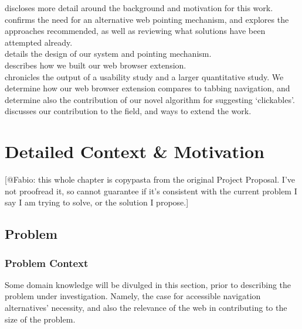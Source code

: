 \documentclass[a4paper, 12pt]{report}
\begin{document}
 discloses more detail around the background and motivation for this work.\\
 confirms the need for an alternative web pointing mechanism, and explores the approaches recommended, as well as reviewing what solutions have been attempted already.\\ %
 details the design of our system and pointing mechanism.\\
 describes how we built our web browser extension.\\
 chronicles the output of a usability study and a larger quantitative study. We determine how our web browser extension compares to tabbing navigation, and determine also the contribution of our novel algorithm for suggesting `clickables'.\\
 discusses our contribution to the field, and ways to extend the work.

\chapter{Detailed Context \& Motivation}
\label{chap:context}
[@Fabio: this whole chapter is copypasta from the original Project Proposal. I've not proofread it, so cannot guarantee if it's consistent with the current problem I say I am trying to solve, or the solution I propose.]
\section{Problem}
\subsection{Problem Context}
Some domain knowledge will be divulged in this section, prior to describing the problem under investigation. Namely, the case for accessible navigation alternatives' necessity, and also the relevance of the web in contributing to the size of the problem.
\end{document}
